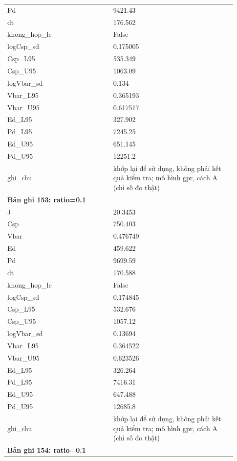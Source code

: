 \begin{longtable}{p{0.43\linewidth}p{0.50\linewidth}}
Pd & 9421.43 \\
dt & 176.562 \\
khong\_\allowbreak hop\_\allowbreak le & False \\
logCsp\_\allowbreak sd & 0.175005 \\
Csp\_\allowbreak L95 & 535.349 \\
Csp\_\allowbreak U95 & 1063.09 \\
logVbar\_\allowbreak sd & 0.134 \\
Vbar\_\allowbreak L95 & 0.365193 \\
Vbar\_\allowbreak U95 & 0.617517 \\
Ed\_\allowbreak L95 & 327.902 \\
Pd\_\allowbreak L95 & 7245.25 \\
Ed\_\allowbreak U95 & 651.145 \\
Pd\_\allowbreak U95 & 12251.2 \\
ghi\_\allowbreak chu & khớp lại để sử dụng, không phải kết quả kiểm tra; mô hình gpr, cách A (chỉ số đo thật) \\
\midrule
\multicolumn{2}{p{0.95\linewidth}}{\textbf{Bản ghi 153: ratio=0.1}} \\
J & 20.3453 \\
Csp & 750.403 \\
Vbar & 0.476749 \\
Ed & 459.622 \\
Pd & 9699.59 \\
dt & 170.588 \\
khong\_\allowbreak hop\_\allowbreak le & False \\
logCsp\_\allowbreak sd & 0.174845 \\
Csp\_\allowbreak L95 & 532.676 \\
Csp\_\allowbreak U95 & 1057.12 \\
logVbar\_\allowbreak sd & 0.13694 \\
Vbar\_\allowbreak L95 & 0.364522 \\
Vbar\_\allowbreak U95 & 0.623526 \\
Ed\_\allowbreak L95 & 326.264 \\
Pd\_\allowbreak L95 & 7416.31 \\
Ed\_\allowbreak U95 & 647.488 \\
Pd\_\allowbreak U95 & 12685.8 \\
ghi\_\allowbreak chu & khớp lại để sử dụng, không phải kết quả kiểm tra; mô hình gpr, cách A (chỉ số đo thật) \\
\midrule
\multicolumn{2}{p{0.95\linewidth}}{\textbf{Bản ghi 154: ratio=0.1}} \\

\end{longtable}
